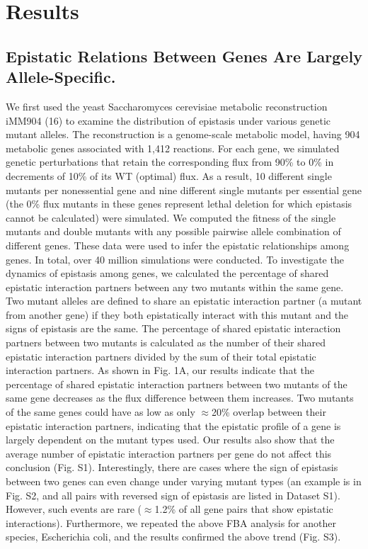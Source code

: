 \section{Results}

\subsection{Epistatic Relations Between Genes Are Largely
Allele-Specific.}

We first used the yeast Saccharomyces cerevisiae metabolic
reconstruction iMM904 (16) to examine the distribution of epistasis
under various genetic mutant alleles. The reconstruction is a
genome-scale metabolic model, having 904 metabolic genes associated
with 1,412 reactions. For each gene, we simulated genetic
perturbations that retain the corresponding flux from 90\% to 0\% in
decrements of 10\% of its WT (optimal) flux. As a result, 10 different
single mutants per nonessential gene and nine different single mutants
per essential gene (the 0\% flux mutants in these genes represent
lethal deletion for which epistasis cannot be calculated) were
simulated. We computed the fitness of the single mutants and double
mutants with any possible pairwise allele combination of different
genes. These data were used to infer the epistatic relationships among
genes. In total, over 40 million simulations were conducted.  To
investigate the dynamics of epistasis among genes, we calculated the
percentage of shared epistatic interaction partners between any two
mutants within the same gene. Two mutant alleles are defined to share
an epistatic interaction partner (a mutant from another gene) if they
both epistatically interact with this mutant and the signs of
epistasis are the same. The percentage of shared epistatic interaction
partners between two mutants is calculated as the number of their
shared epistatic interaction partners divided by the sum of their
total epistatic interaction partners. As shown in Fig. 1A, our results
indicate that the percentage of shared epistatic interaction partners
between two mutants of the same gene decreases as the flux difference
between them increases. Two mutants of the same genes could have as
low as only $\approx$20\% overlap between their epistatic interaction
partners, indicating that the epistatic profile of a gene is largely
dependent on the mutant types used. Our results also show that the
average number of epistatic interaction partners per gene do not
affect this conclusion (Fig. S1). Interestingly, there are cases where
the sign of epistasis between two genes can even change under varying
mutant types (an example is in Fig. S2, and all pairs with reversed
sign of epistasis are listed in Dataset S1). However, such events are
rare ($\approx$1.2\% of all gene pairs that show epistatic
interactions). Furthermore, we repeated the above FBA analysis for
another species, Escherichia coli, and the results confirmed the above
trend (Fig. S3).


